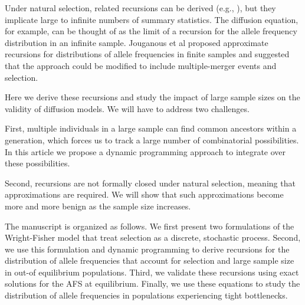 \documentclass[9pt,twocolumn,twoside,lineno]{gsajnl}
\begin{document}
Under natural selection, related recursions can be derived (e.g., \cite{DonnellyKurtz1999a, KroneNeuhauser1997, JouganousEtAl2017}), but they implicate large to infinite numbers of summary statistics. The diffusion equation, for example, can be thought of as the limit of a recursion for the allele frequency distribution in an infinite sample. Jouganous et al \cite{JouganousEtAl2017} proposed approximate recursions for distributions of allele frequencies in finite samples and suggested that the approach could be modified to include multiple-merger events and selection.  

Here we derive these recursions and study the impact of large sample sizes on the validity of diffusion models. We will have to address two challenges. 

First, multiple individuals in a large sample can find common ancestors within a generation, which forces us to track a large number of combinatorial possibilities.  In this article we propose a dynamic programming approach to integrate over these possibilities. 

Second, recursions are not formally closed under natural selection, meaning that approximations are required. We will show that such approximations become more and more benign as the sample size increases. 



The manuscript is organized as follows. We first present two formulations of the Wright-Fisher model that treat selection as a discrete, stochastic process. Second, we use this formulation and dynamic programming to derive recursions for the distribution of allele frequencies that account for selection and large sample size in out-of equilibrium populations. Third, we validate these recursions using exact solutions for the AFS at equilibrium. Finally, we use these equations to study the distribution of allele frequencies in populations experiencing tight bottlenecks. 
\end{document}
